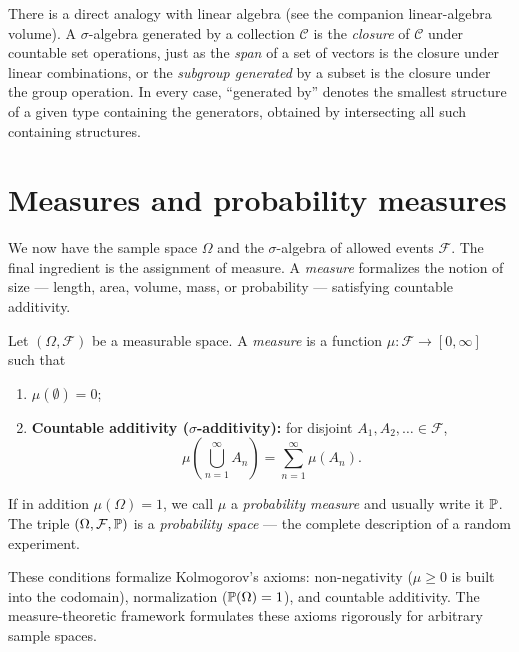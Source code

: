 \begin{connectionbox}
There is a direct analogy with linear algebra (see the companion linear-algebra
volume). A $\sigma$-algebra generated by a collection $\mathcal{C}$ is the
\emph{closure} of $\mathcal{C}$ under countable set operations, just as the
\emph{span} of a set of vectors is the closure under linear combinations, or the
\emph{subgroup generated} by a subset is the closure under the group operation.
In every case, ``generated by'' denotes the smallest structure of a given type containing
the generators, obtained by intersecting all such containing structures.
\end{connectionbox}

\section{Measures and probability measures}
\label{ch36:measures}

We now have the sample space $\Omega$ and the $\sigma$-algebra of allowed events $\mathcal{F}$.
The final ingredient is the assignment of measure. A \emph{measure} formalizes the
notion of size --- length, area, volume, mass, or probability --- satisfying countable additivity.

\begin{definition}
\label{ch36:measure-def}
Let $(\Omega, \mathcal{F})$ be a measurable space. A \emph{measure} is a function
$\mu : \mathcal{F} \to [0, \infty]$ such that
\begin{enumerate}
  \item $\mu(\emptyset) = 0$;
  \item \textbf{Countable additivity (}$\sigma$\textbf{-additivity):} for disjoint
        $A_1, A_2, \dots \in \mathcal{F}$,
        \[
          \mu\!\left(\bigcup_{n=1}^{\infty} A_n\right)
          = \sum_{n=1}^{\infty} \mu(A_n).
        \]
\end{enumerate}
If in addition $\mu(\Omega) = 1$, we call $\mu$ a \emph{probability measure} and
usually write it $\P$. The triple $(\Omega, \mathcal{F}, \P)$ is a
\emph{probability space} --- the complete description of a random experiment.
\end{definition}

These conditions formalize Kolmogorov's axioms: non-negativity
($\mu \ge 0$ is built into the codomain), normalization ($\P(\Omega)=1$), and
countable additivity. The measure-theoretic framework formulates these axioms
rigorously for arbitrary sample spaces.


